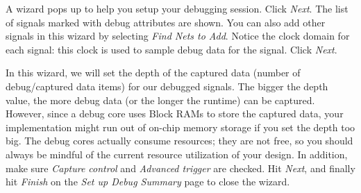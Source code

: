\documentclass[11pt]{article}
\begin{document}
\begin{appendices}
\begin{center}
\end{center}

A wizard pops up to help you setup your debugging session. Click \emph{Next}. The list of signals marked with debug attributes are shown. You can also add other signals in this wizard by selecting \emph{Find Nets to Add}. Notice the clock domain for each signal: this clock is used to sample debug data for the signal. Click \emph{Next}.

\begin{center}
\end{center}

In this wizard, we will set the depth of the captured data (number of debug/captured data items) for our debugged signals. The bigger the depth value, the more debug data (or the longer the runtime) can be captured. However, since a debug core uses Block RAMs to store the captured data, your implementation might run out of on-chip memory storage if you set the depth too big. The debug cores actually consume resources; they are not free, so you should always be mindful of the current resource utilization of your design. In addition, make sure \emph{Capture control} and \emph{Advanced trigger} are checked. Hit \emph{Next}, and finally hit \emph{Finish} on the \textit{Set up Debug Summary} page to close the wizard.


\end{appendices}
\end{document}
